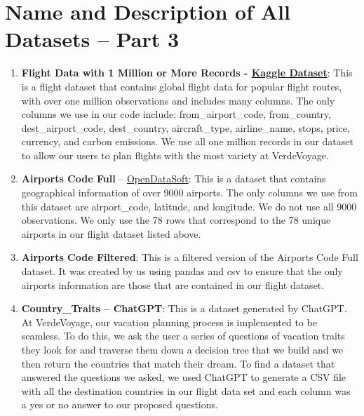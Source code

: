 \documentclass[11pt]{article}
\begin{document}
\section*{Name and Description of All Datasets -- Part 3}

\begin{enumerate}
    \item \textbf{Flight Data with 1 Million or More Records - \href{https://www.kaggle.com/datasets/polartech/flight-data-with-1-million-or-more-records}{Kaggle Dataset}}: This is a flight dataset that contains global flight data for popular flight routes, with over one million observations and includes many columns. The only columns we use in our code include: from\_airport\_code, from\_country, dest\_airport\_code, dest\_country, aircraft\_type, airline\_name, stops, price, currency, and carbon emissions. We use all one million records in our dataset to allow our users to plan flights with the most variety at VerdeVoyage.
    
    \item \textbf {Airports Code Full} -- \href {https://data.opendatasoft.com/explore/dataset/airports-code%40public/table/}{OpenDataSoft}: This is a dataset that contains geographical information of over 9000 airports. The only columns we use from this dataset are airport\_code, latitude, and longitude. We do not use all 9000 observations. We only use the 78 rows that correspond to the 78 unique airports in our flight dataset listed above.
    
    \item \textbf {Airports Code Filtered}: This is a filtered version of the Airports Code Full dataset. It was created by us using pandas and csv to ensure that the only airports information are those that are contained in our flight dataset.
    
    \item \textbf{Country\_Traits -- ChatGPT}: This is a dataset generated by ChatGPT. At VerdeVoyage, our vacation planning process is implemented to be seamless. To do this, we ask the user a series of questions of vacation traits they look for and traverse them down a decision tree that we build and we then return the countries that match their dream. To find a dataset that answered the questions we asked, we used ChatGPT to generate a CSV file with all the destination countries in our flight data set and each column was a yes or no answer to our proposed questions.
\end{enumerate}
\end{document}
